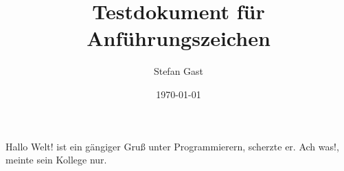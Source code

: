 \documentclass{scrartcl}
\title{Testdokument für Anführungszeichen}
\author{Stefan Gast}
\date{\today}
\begin{document}
	\maketitle

	\glqq\glq Hallo Welt!\grq{} ist ein gängiger Gruß unter Programmierern\grqq{}, scherzte er.
	\flqq Ach was!\frqq{}, meinte sein Kollege nur.
\end{document}
